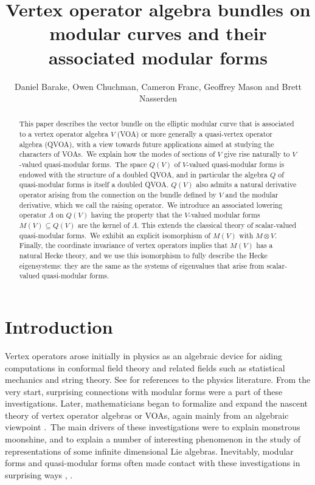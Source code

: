 \documentclass[12pt]{amsart}
\theoremstyle{plain}
\theoremstyle{definition}
\theoremstyle{remark}
\begin{document}
\title[VOA bundles on modular curves]{Vertex operator algebra bundles on modular curves and their associated modular forms}
\author[Barake, Chuchman, Franc, Mason, Nasserden]{Daniel Barake, Owen Chuchman, Cameron Franc, Geoffrey Mason and Brett Nasserden}
\date{}

\begin{abstract}
This paper describes the vector bundle on the elliptic modular curve that is associated to a vertex operator algebra $V$ (VOA) or more generally a quasi-vertex operator algebra (QVOA), with a view towards future applications aimed at studying the characters of VOAs.\ We explain how the modes of sections of $V$ give rise naturally to $V$-valued quasi-modular forms.\ The space $Q(V)$ of $V$-valued quasi-modular forms is endowed with the structure of a doubled QVOA, and in particular the algebra $Q$ of quasi-modular forms is itself a doubled QVOA. $Q(V)$ also admits a natural derivative operator arising from the connection on the bundle defined by $V$ and the modular derivative, which we call the raising operator.\ We introduce an associated lowering operator $\Lambda$ on $Q(V)$ having the property that the $V$-valued modular forms $M(V)\subseteq Q(V)$ are the kernel of $\Lambda$. This extends the classical theory of scalar-valued quasi-modular forms.\ We exhibit an explicit isomorphism of $M(V)$ with $M \otimes V$. Finally, the coordinate invariance of vertex operators implies that $M(V)$ has a natural Hecke theory, and we use this isomorphism to fully describe the Hecke eigensystems: they are the same as the systems of eigenvalues that arise from scalar-valued quasi-modular forms.
\end{abstract}
\maketitle
\tableofcontents

\section{Introduction}\label{ss:notation}
Vertex operators arose initially in physics as an algebraic device for aiding computations in conformal field theory and related fields such as statistical mechanics and string theory. See \cite{CFTBook} for references to the physics literature. From the very start, surprising connections with modular forms were a part of these investigations. Later, mathematicians began to formalize and expand  the nascent theory of vertex operator algebras or VOAs, again mainly from an algebraic viewpoint \cite{FHL}.\ The main drivers of these investigations were to explain monstrous moonshine, and to explain a number of interesting phenomenon in the study of representations of some infinite dimensional Lie algebras. Inevitably, modular forms and quasi-modular forms often made contact with these investigations in surprising ways \cite{KacPetersen}, \cite{FLM}.
\end{document}
